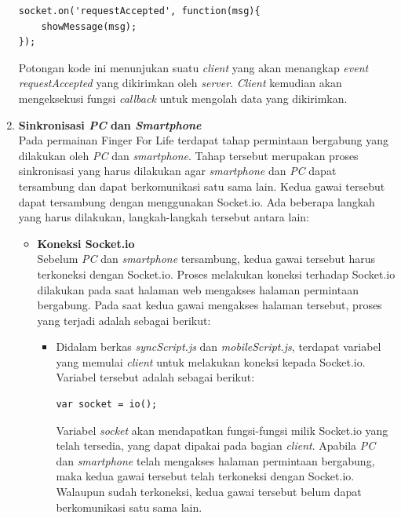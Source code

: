 \begin{enumerate}
\begin{lstlisting}[caption={proses \textit{event} diterima}, label={lst:req_accepted}, captionpos=b]
socket.on('requestAccepted', function(msg){
	showMessage(msg);
});
\end{lstlisting}
Potongan kode ini menunjukan suatu \textit{client} yang akan menangkap \textit{event requestAccepted} yang dikirimkan oleh \textit{server}. \textit{Client} kemudian akan mengeksekusi fungsi \textit{callback} untuk mengolah data yang dikirimkan.
	
	\item \textbf{Sinkronisasi \textit{PC} dan \textit{Smartphone}} \\
	Pada permainan Finger For Life terdapat tahap permintaan bergabung yang dilakukan oleh \textit{PC} dan \textit{smartphone}. Tahap tersebut merupakan proses sinkronisasi yang harus dilakukan agar \textit{smartphone} dan \textit{PC} dapat tersambung dan dapat berkomunikasi satu sama lain. Kedua gawai tersebut dapat tersambung dengan menggunakan Socket.io. Ada beberapa langkah yang harus dilakukan, langkah-langkah tersebut antara lain:
	\begin{itemize}
		\item \textbf{Koneksi Socket.io} \\
		Sebelum \textit{PC} dan \textit{smartphone} tersambung, kedua gawai tersebut harus terkoneksi dengan Socket.io. Proses melakukan koneksi terhadap Socket.io dilakukan pada saat halaman web mengakses halaman permintaan bergabung. Pada saat kedua gawai mengakses halaman tersebut, proses yang terjadi adalah sebagai berikut:
		\begin{itemize}
			\item Didalam berkas \textit{syncScript.js} dan \textit{mobileScript.js}, terdapat variabel yang memulai \textit{client} untuk melakukan koneksi kepada Socket.io. Variabel tersebut adalah sebagai berikut:
\begin{lstlisting}
var socket = io();
\end{lstlisting}
			Variabel \textit{socket} akan mendapatkan fungsi-fungsi milik Socket.io yang telah tersedia, yang dapat dipakai pada bagian \textit{client}. Apabila \textit{PC} dan \textit{smartphone} telah mengakses halaman permintaan bergabung, maka kedua gawai tersebut telah terkoneksi dengan Socket.io. Walaupun sudah terkoneksi, kedua gawai tersebut belum dapat berkomunikasi satu sama lain.
		\end{itemize}
	

\end{itemize}
\end{enumerate}
